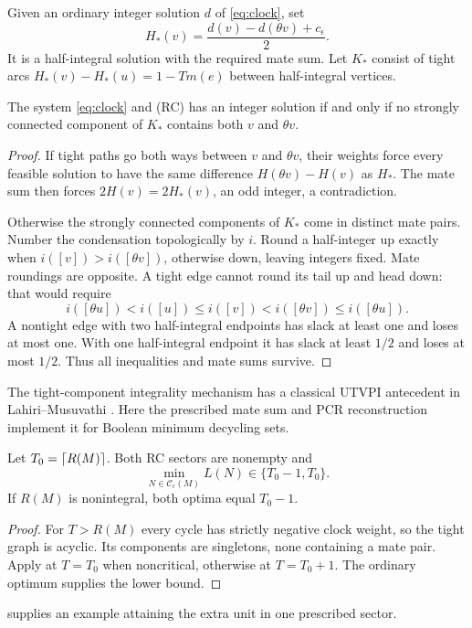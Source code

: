 Given an ordinary integer solution $d$ of \eqref{eq:clock}, set
\[
 H_*(v)=\frac{d(v)-d(\theta v)+c_\epsilon}{2}.
\]
It is a half-integral solution with the required mate sum. Let
$K_*$ consist of tight arcs
$H_*(v)-H_*(u)=1-Tm(e)$ between half-integral vertices.

\begin{theorem}
\label{thm:rc-rounding}
The system \eqref{eq:clock} and (RC) has an integer solution
if and only if no strongly connected component of $K_*$
contains both $v$ and $\theta v$.
\end{theorem}
\begin{proof}
If tight paths go both ways between $v$ and $\theta v$, their
weights force every feasible solution to have the same difference
$H(\theta v)-H(v)$ as $H_*$. The mate sum then forces
$2H(v)=2H_*(v)$, an odd integer, a contradiction.

Otherwise the strongly connected components of $K_*$ come in
distinct mate pairs. Number the condensation topologically by $i$.
Round a half-integer up exactly when
$i([v])>i([\theta v])$, otherwise down, leaving integers fixed.
Mate roundings are opposite. A tight edge cannot round its tail
up and head down: that would require
\[
 i([\theta u])<i([u])\le i([v])<i([\theta v])
                    \le i([\theta u]).
\]
A nontight edge with two half-integral endpoints has slack at
least one and loses at most one. With one half-integral endpoint
it has slack at least $1/2$ and loses at most $1/2$.
Thus all inequalities and mate sums survive.
\end{proof}
The tight-component integrality mechanism has a classical UTVPI
antecedent in Lahiri--Musuvathi \cite[Section 4.2]{LahiriMusuvathi2005}.
Here the prescribed mate sum and PCR reconstruction implement it
for Boolean minimum decycling sets.

\begin{corollary}\label{cor:parity-cost}
Let $T_0=\left\lceil R(M)\right\rceil$. Both RC sectors are nonempty and
\[
 \min_{N\in\mathcal C_\epsilon(M)}L(N)\in\{T_0-1,T_0\}.
\]
If $R(M)$ is nonintegral, both optima equal $T_0-1$.
\end{corollary}
\begin{proof}
For $T>R(M)$ every cycle has strictly negative clock weight,
so the tight graph is acyclic. Its components are singletons,
none containing a mate pair. Apply  at
$T=T_0$ when noncritical, otherwise at $T=T_0+1$.
The ordinary optimum supplies the lower bound.
\end{proof}
 supplies an example attaining the extra
unit in one prescribed sector.

